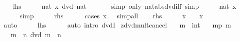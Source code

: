 \begin{isabellebody}
%
\endisadelimproof
%
\isatagproof
{}\isamarkupfalse%
\isanewline
\ \ \isamarkupfalse%
\ {\isacharquery}{\kern0pt}lhs\isanewline
\ \ \isamarkupfalse%
\ \isamarkupfalse%
\ {\isachardoublequoteopen}nat\ {\isasymbar}x{\isasymbar}\ dvd\ nat\ {\isasymbar}{}{\isasymbar}{\isachardoublequoteclose}\isanewline
\ \ \ \ \isamarkupfalse%
\ {\isacharparenleft}{\kern0pt}simp\ only{\isacharcolon}{\kern0pt}\ nat{\isacharunderscore}{\kern0pt}abs{\isacharunderscore}{\kern0pt}dvd{\isacharunderscore}{\kern0pt}iff{\isacharparenright}{\kern0pt}\ simp\isanewline
\ \ \isamarkupfalse%
\ \isamarkupfalse%
\ {\isachardoublequoteopen}nat\ {\isasymbar}x{\isasymbar}\ {\isacharequal}{\kern0pt}\ {}{\isachardoublequoteclose}\isanewline
\ \ \ \ \isamarkupfalse%
\ simp\isanewline
\ \ \isamarkupfalse%
\ \isamarkupfalse%
\ {\isacharquery}{\kern0pt}rhs\isanewline
\ \ \ \ \isamarkupfalse%
\ {\isacharparenleft}{\kern0pt}cases\ {\isachardoublequoteopen}x\ {\isacharless}{\kern0pt}\ {}{\isachardoublequoteclose}{\isacharparenright}{\kern0pt}\ simp{\isacharunderscore}{\kern0pt}all\isanewline
{}\isamarkupfalse%
\isanewline
\ \ \isamarkupfalse%
\ {\isacharquery}{\kern0pt}rhs\isanewline
\ \ \isamarkupfalse%
\ \isamarkupfalse%
\ {\isachardoublequoteopen}x\ {\isacharequal}{\kern0pt}\ {}\ {\isasymor}\ x\ {\isacharequal}{\kern0pt}\ {\isacharminus}{\kern0pt}\ {}{\isachardoublequoteclose}\isanewline
\ \ \ \ \isamarkupfalse%
\ auto\isanewline
\ \ \isamarkupfalse%
\ \isamarkupfalse%
\ {\isacharquery}{\kern0pt}lhs\isanewline
\ \ \ \ \isamarkupfalse%
\ {\isacharparenleft}{\kern0pt}auto\ intro{\isacharcolon}{\kern0pt}\ dvdI{\isacharparenright}{\kern0pt}\isanewline
{}\isamarkupfalse%
%
\endisatagproof
{\isafoldproof}%
%
\isadelimproof
\isanewline
%
\endisadelimproof
\isanewline
{}\isamarkupfalse%
\ zdvd{\isacharunderscore}{\kern0pt}mult{\isacharunderscore}{\kern0pt}cancel{}{\isacharcolon}{\kern0pt}\isanewline
\ \ \ m\ {\isacharcolon}{\kern0pt}{\isacharcolon}{\kern0pt}\ int\isanewline
\ \ \ mp{\isacharcolon}{\kern0pt}\ {\isachardoublequoteopen}m\ {\isasymnoteq}\ {}{\isachardoublequoteclose}\isanewline
\ \ \ {\isachardoublequoteopen}m\ {\isacharasterisk}{\kern0pt}\ n\ dvd\ m\ {\isasymlongleftrightarrow}\ {\isasymbar}n{\isasymbar}\ {\isacharequal}{\kern0pt}\ {}{\isachardoublequoteclose}\isanewline

\end{isabellebody}
